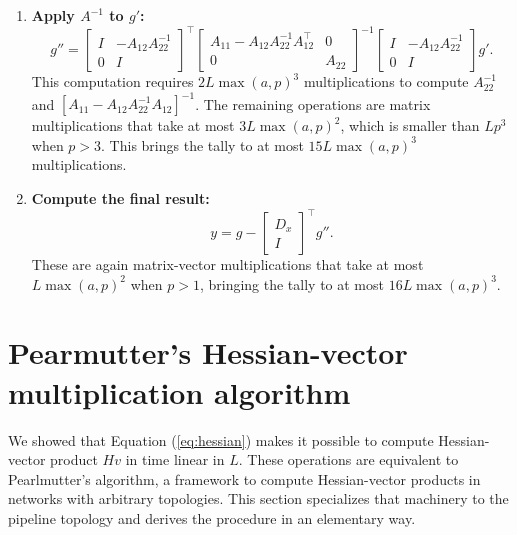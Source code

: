 \documentclass{article}
\begin{document}
\begin{enumerate}
    \item
          \textbf{Apply $A^{-1}$ to $g'$:}
          \[
              g'' =
              \begin{bmatrix}
                  I & -A_{12} A_{22}^{-1} \\ 0 & I
              \end{bmatrix}
              ^\top
              \begin{bmatrix}
                  A_{11} - A_{12} A_{22}^{-1} A_{12}^\top & 0      \\
                  0                                       & A_{22}
              \end{bmatrix}
              ^{-1}
              \begin{bmatrix}
                  I & -A_{12} A_{22}^{-1} \\ 0 & I
              \end{bmatrix}
              g'.
          \]
          This computation requires $2L\max(a,p)^3$ multiplications to compute
          $A_{22}^{-1}$ and $\left[A_{11}-A_{12} A_{22}^{-1}A_{12}\right]^{-1}$. The
          remaining operations are matrix multiplications that take at most
          $3L\max(a,p)^2$, which is smaller than $Lp^3$ when $p>3$. This brings the tally
          to at most $15L\max(a,p)^3$ multiplications.

    \item
          \textbf{Compute the final result:}
          \[
              y = g - \begin{bmatrix}
                  D_x \\ I
              \end{bmatrix}
              ^\top g''.
          \]
          These are again matrix-vector multiplications that take at most $L\max(a,p)^2$
          when $p>1$, bringing the tally to at most $16L\max(a,p)^3$.
\end{enumerate}




\appendix \section{Pearmutter's Hessian-vector multiplication algorithm}
\label{sec:pearlmutter}

We showed that Equation (\ref{eq:hessian}) makes it possible to compute
Hessian-vector product $H v$ in time linear in $L$. These operations are
equivalent to Pearlmutter's \cite{pearlmutter94} algorithm, a framework to
compute Hessian-vector products in networks with arbitrary topologies. This
section specializes that machinery to the pipeline topology and derives the
procedure in an elementary way.
\end{document}
